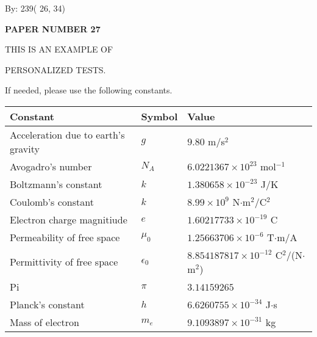 \documentclass[12pt]{article}
\begin{document}
   
\hspace{1.0in} By: 
         239(         26,          34)
   
   
   
   
\newpage 
\setcounter{page}{ 
    27001 } 
   
   
   
   
 {\textbf{ \Large{ PAPER NUMBER          27 }}}
   
   
\vspace{0.2in}
   
   
   
   
   
   
   
   
 \vspace{0.2in}
 
 
{\Huge  THIS IS AN EXAMPLE OF}
 
{\Huge  PERSONALIZED TESTS. }
 
If needed, please use the following constants.
 
 
 
\noindent\begin{tabular}{|l|l|l|}
\hline
Constant & Symbol & Value \\
\hline
Acceleration due to earth's gravity &
$g$ &
 $ 9.80 $
m/s$^2$ \\
\hline
Avogadro's number &
$N_A$ &
 $ 6.0221367 \times 10^{23} $
mol$^{-1}$ \\
\hline
Boltzmann's constant &
$k$ &
 $ 1.380658 \times 10^{-23} $
J/K \\
\hline
Coulomb's constant &
$k$ &
 $ 8.99 \times 10^{9} $
N$\cdot $m$^2$/C$^2$ \\
\hline
Electron charge magnitiude &
$e$ &
 $ 1.60217733 \times 10^{-19} $
C \\
\hline
Permeability of free space &
$\mu _0$ &
 $ 1.25663706 \times 10^{-6} $
T$\cdot $m/A \\
\hline
Permittivity of free space &
$\epsilon _0$ &
 $ 8.854187817 \times 10^{-12} $
C$^2$/(N$\cdot $m$^2$) \\
\hline
Pi &
$\pi$ &
 $ 3.14159265 $
$ $ \\
\hline
Planck's constant &
$h$ &
 $ 6.6260755 \times 10^{-34} $
J$\cdot $s \\
\hline
Mass of electron &
$m_e$ &
 $ 9.1093897 \times 10^{-31} $
kg \\
\hline
\end{tabular}
 
\end{document}
